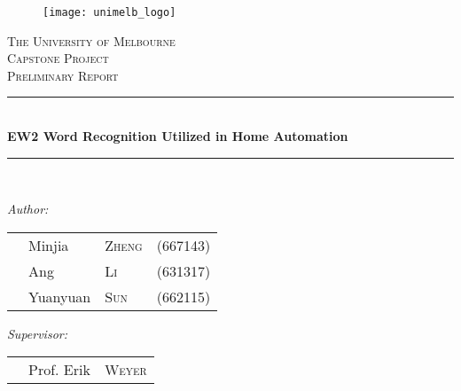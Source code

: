 \begin{titlepage}

\newcommand{\HRule}{\rule{\linewidth}{0.5mm}} %

\center %
 

\begin{figure}[H]
\centering
\texttt{[image: unimelb\_logo]}
\end{figure}
\textsc{\LARGE The University of Melbourne}\\[1.5cm] %
\textsc{\Large Capstone Project}\\[0.5cm] %
\textsc{\large Preliminary Report}\\[0.5cm] %


\HRule \\[0.4cm]
{\large \bfseries EW2 Word Recognition Utilized in Home Automation}\\[0.4cm] %
\HRule \\[1.5cm]


\begin{flushleft} \large
\emph{Author:}\\
\begin{tabular}{llll}
&Minjia		&\textsc{Zheng}	&(667143)\\
&Ang		&\textsc{Li}	&(631317)\\
&Yuanyuan	&\textsc{Sun}	&(662115)
\end{tabular}
\end{flushleft}

\begin{flushleft} \large
\emph{Supervisor:} \\
\begin{tabular}{lll}
&Prof. Erik &\textsc{Weyer}
\end{tabular}
\end{flushleft}


\end{titlepage}
